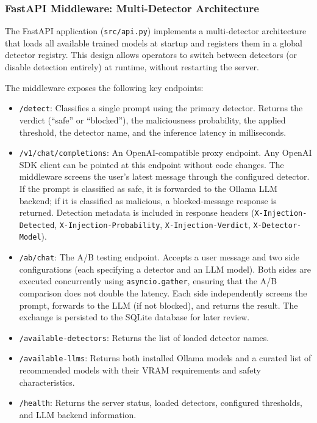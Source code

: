 \documentclass[12pt, letterpaper]{article}   %
\begin{document}
\subsubsection{FastAPI Middleware: Multi-Detector Architecture}

The FastAPI application (\texttt{src/api.py}) implements a multi-detector architecture that loads all available trained models at startup and registers them in a global detector registry. This design allows operators to switch between detectors (or disable detection entirely) at runtime, without restarting the server.

The middleware exposes the following key endpoints:

\begin{itemize}
    \item \texttt{/detect}: Classifies a single prompt using the primary detector. Returns the verdict (``safe'' or ``blocked''), the maliciousness probability, the applied threshold, the detector name, and the inference latency in milliseconds.

    \item \texttt{/v1/chat/completions}: An OpenAI-compatible proxy endpoint. Any OpenAI SDK client can be pointed at this endpoint without code changes. The middleware screens the user's latest message through the configured detector. If the prompt is classified as safe, it is forwarded to the Ollama LLM backend; if it is classified as malicious, a blocked-message response is returned. Detection metadata is included in response headers (\texttt{X-Injection-Detected}, \texttt{X-Injection-Probability}, \texttt{X-Injection-Verdict}, \texttt{X-Detector-Model}).

    \item \texttt{/ab/chat}: The A/B testing endpoint. Accepts a user message and two side configurations (each specifying a detector and an LLM model). Both sides are executed concurrently using \texttt{asyncio.gather}, ensuring that the A/B comparison does not double the latency. Each side independently screens the prompt, forwards to the LLM (if not blocked), and returns the result. The exchange is persisted to the SQLite database for later review.

    \item \texttt{/available-detectors}: Returns the list of loaded detector names.
    \item \texttt{/available-llms}: Returns both installed Ollama models and a curated list of recommended models with their VRAM requirements and safety characteristics.
    \item \texttt{/health}: Returns the server status, loaded detectors, configured thresholds, and LLM backend information.
\end{itemize}
\end{document}
